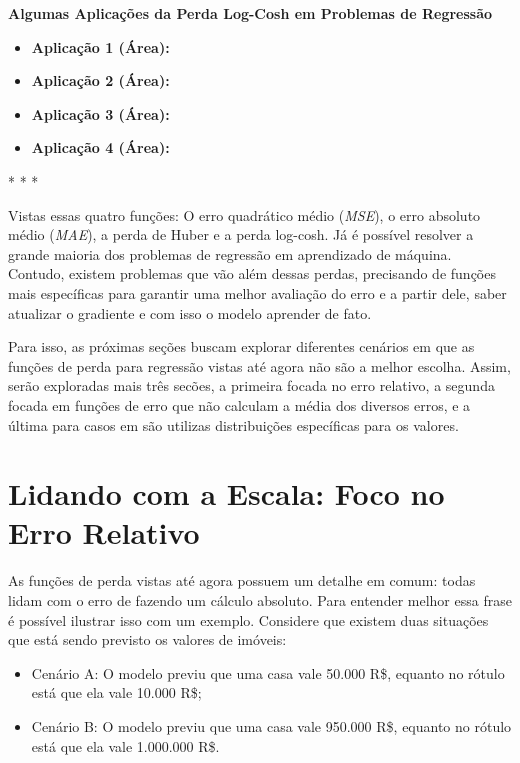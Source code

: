 \textbf{Algumas Aplicações da Perda Log-Cosh em Problemas de Regressão}
\vspace{1em}

\begin{itemize}
    \item \textbf{Aplicação 1 (Área):}
    \item \textbf{Aplicação 2 (Área):}
    \item \textbf{Aplicação 3 (Área):}
    \item \textbf{Aplicação 4 (Área):}
\end{itemize}

\medskip
\begin{center}
 * * *
\end{center}
\medskip

Vistas essas quatro funções: O erro quadrático médio (\textit{MSE}), o erro absoluto médio (\textit{MAE}), a perda de Huber e a perda log-cosh. Já é possível resolver a grande maioria dos problemas de regressão em aprendizado de máquina. Contudo, existem problemas que vão além dessas perdas, precisando de funções mais específicas para garantir uma melhor avaliação do erro e a partir dele, saber atualizar o gradiente e com isso o modelo aprender de fato.

Para isso, as próximas seções buscam explorar diferentes cenários em que as funções de perda para regressão vistas até agora não são a melhor escolha. Assim, serão exploradas mais três secões, a primeira focada no erro relativo, a segunda focada em funções de erro que não calculam a média dos diversos erros, e a última para casos em são utilizas distribuições específicas para os valores.

\section{Lidando com a Escala: Foco no Erro Relativo}

As funções de perda vistas até agora possuem um detalhe em comum: todas lidam com o erro de fazendo um cálculo absoluto. Para entender melhor essa frase é possível ilustrar isso com um exemplo. Considere que existem duas situações que está sendo previsto os valores de imóveis:

\begin{itemize}
    \item Cenário A: O modelo previu que uma casa vale 50.000 R\$, equanto no rótulo está que ela vale 10.000 R\$;
    \item Cenário B: O modelo previu que uma casa vale 950.000 R\$, equanto no rótulo está que ela vale 1.000.000 R\$.
\end{itemize}

